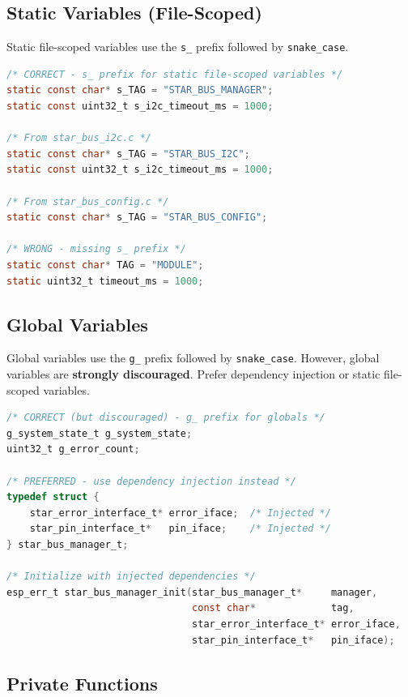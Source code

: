 \subsection{Static Variables (File-Scoped)}

Static file-scoped variables use the \texttt{s\_} prefix followed by \texttt{snake\_case}.

\begin{lstlisting}[language=C]
/* CORRECT - s_ prefix for static file-scoped variables */
static const char* s_TAG = "STAR_BUS_MANAGER";
static const uint32_t s_i2c_timeout_ms = 1000;

/* From star_bus_i2c.c */
static const char* s_TAG = "STAR_BUS_I2C";
static const uint32_t s_i2c_timeout_ms = 1000;

/* From star_bus_config.c */
static const char* s_TAG = "STAR_BUS_CONFIG";

/* WRONG - missing s_ prefix */
static const char* TAG = "MODULE";
static uint32_t timeout_ms = 1000;
\end{lstlisting}

\subsection{Global Variables}

Global variables use the \texttt{g\_} prefix followed by \texttt{snake\_case}. However, global variables are \textbf{strongly discouraged}. Prefer dependency injection or static file-scoped variables.

\begin{lstlisting}[language=C]
/* CORRECT (but discouraged) - g_ prefix for globals */
g_system_state_t g_system_state;
uint32_t g_error_count;

/* PREFERRED - use dependency injection instead */
typedef struct {
    star_error_interface_t* error_iface;  /* Injected */
    star_pin_interface_t*   pin_iface;    /* Injected */
} star_bus_manager_t;

/* Initialize with injected dependencies */
esp_err_t star_bus_manager_init(star_bus_manager_t*     manager,
                                const char*             tag,
                                star_error_interface_t* error_iface,
                                star_pin_interface_t*   pin_iface);
\end{lstlisting}

\subsection{Private Functions}

